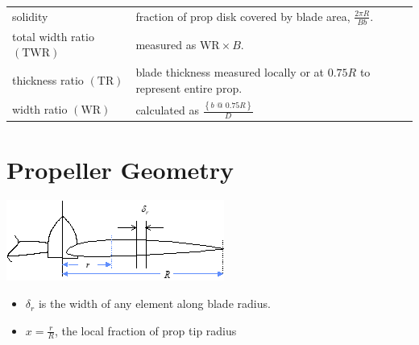 \documentclass[
]{book}
\providecommand{\tightlist}{%
  \setlength{\itemsep}{0pt}\setlength{\parskip}{0pt}}
\begin{document}
\begin{longtable}[]{@{}ll@{}}
\begin{minipage}[t]{0.29\columnwidth}
solidity\strut
\end{minipage} & \begin{minipage}[t]{0.65\columnwidth}\raggedright
fraction of prop disk covered by blade area, \(\frac{2\pi R}{Bb}\).\strut
\end{minipage}\tabularnewline
\begin{minipage}[t]{0.29\columnwidth}\raggedright
total width ratio \(\left( \mathrm{TWR} \right)\)\strut
\end{minipage} & \begin{minipage}[t]{0.65\columnwidth}\raggedright
measured as \(\textrm{WR} \times B\).\strut
\end{minipage}\tabularnewline
\begin{minipage}[t]{0.29\columnwidth}\raggedright
thickness ratio \(\left( \mathrm{TR} \right)\)\strut
\end{minipage} & \begin{minipage}[t]{0.65\columnwidth}\raggedright
blade thickness measured locally or at \(0.75 R\) to represent entire prop.\strut
\end{minipage}\tabularnewline
\begin{minipage}[t]{0.29\columnwidth}\raggedright
width ratio \(\left( \mathrm{WR} \right)\)\strut
\end{minipage} & \begin{minipage}[t]{0.65\columnwidth}\raggedright
calculated as \(\frac{ \left\{ b \text{ @ } 0.75 R \right\} }{D}\)\strut
\end{minipage}\tabularnewline
\bottomrule
\end{longtable}

\hypertarget{propeller-geometry}{%
\section{Propeller Geometry}\label{propeller-geometry}}

\includegraphics[width=2.81181in,height=1.04167in]{media/11/image4.png}

\begin{itemize}
\tightlist
\item
  \(\delta_r\) is the width of any element along blade radius.
\item
  \(x = \frac{r}{R}\), the local fraction of prop tip radius
\end{itemize}
\end{document}
